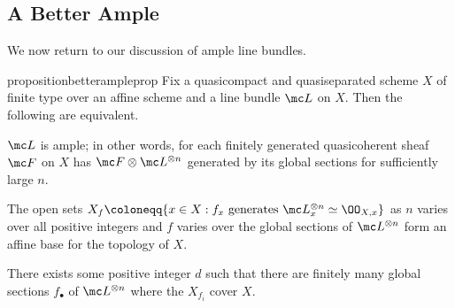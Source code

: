 \documentclass[../notes.tex]{subfiles}
\begin{document}
\subsection{A Better Ample}
We now return to our discussion of ample line bundles.
\begin{restatable}{proposition}{betterampleprop}
	Fix a quasicompact and quasiseparated scheme $X$ of finite type over an affine scheme and a line bundle $\mc L$ on $X$. Then the following are equivalent.
	\begin{listalph}
		\item $\mc L$ is ample; in other words, for each finitely generated quasicoherent sheaf $\mc F$ on $X$ has $\mc F\otimes\mc L^{\otimes n}$ generated by its global sections for sufficiently large $n$.
		\item The open sets $X_f\coloneqq\{x\in X:f_x\text{ generates }\mc L_x^{\otimes n}\simeq\OO_{X,x}\}$ as $n$ varies over all positive integers and $f$ varies over the global sections of $\mc L^{\otimes n}$ form an affine base for the topology of $X$.
		\item There exists some positive integer $d$ such that there are finitely many global sections $f_\bullet$ of $\mc L^{\otimes n}$ where the $X_{f_i}$ cover $X$.
	\end{listalph}
\end{restatable}
\end{document}
